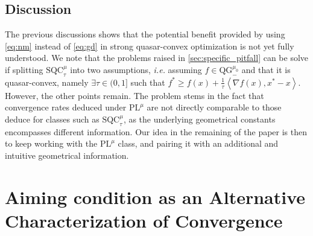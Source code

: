 \documentclass{article}
\def\pl{{\text{PL}^\mu}}
\newcommand{\dotprod}[1]{\left< #1\right>}
\newcommand{\sqc}{\text{SQC}_{\tau}^{\mu}}
\newcommand{\qginf}{\text{QG}_{-}^{\mu_0}}
\theoremstyle{plain}
\theoremstyle{definition}
\theoremstyle{remark}
\begin{document}
\subsection{Discussion}
The previous discussions shows that the potential benefit provided by using \eqref{eq:nm} instead of \eqref{eq:gd} in strong quasar-convex optimization is not yet fully understood. We note that the problems raised in \cref{sec:specific_pitfall} can be solve if splitting $\sqc$ into two assumptions, \textit{i.e.} assuming $f \in \qginf$ and that it is quasar-convex, namely $\exists \tau \in(0,1]$ such that $f^\ast \ge f(x) + \frac{1}{\tau}\dotprod{\nabla f(x),x^\ast-x}$. However, the other points remain. The problem stems in the fact that convergence rates deduced under $\pl$ are not directly comparable to those deduce for classes such as $\sqc$, as the underlying geometrical constants encompasses different information. Our idea in the remaining of the paper is then to keep working with the $\pl$ class, and pairing it with an additional and intuitive geometrical information.



\section{Aiming condition as an Alternative Characterization of Convergence}\label{sec:aiming_cond}
\end{document}
